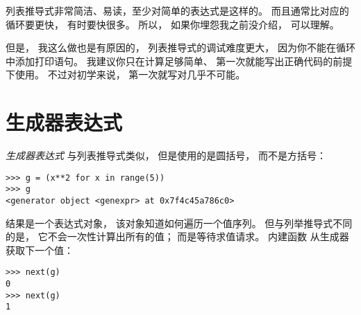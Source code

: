 列表推导式非常简洁、易读，至少对简单的表达式是这样的。
而且通常比对应的  循环要更快， 有时要快很多。
所以， 如果你埋怨我之前没介绍， 可以理解。


但是， 我这么做也是有原因的， 列表推导式的调试难度更大， 因为你不能在循环中添加打印语句。
我建议你只在计算足够简单、 第一次就能写出正确代码的前提下使用。
不过对初学来说， 第一次就写对几乎不可能。


\section{生成器表达式}


{\em 生成器表达式} 与列表推导式类似， 但是使用的是圆括号， 而不是方括号：

  

\begin{lstlisting}
>>> g = (x**2 for x in range(5))
>>> g
<generator object <genexpr> at 0x7f4c45a786c0>
\end{lstlisting}


结果是一个表达式对象， 该对象知道如何遍历一个值序列。  但与列举推导式不同的是， 它不会一次性计算出所有的值； 而是等待求值请求。  内建函数  从生成器获取下一个值：


\begin{lstlisting}
>>> next(g)
0
>>> next(g)
1
\end{lstlisting}

